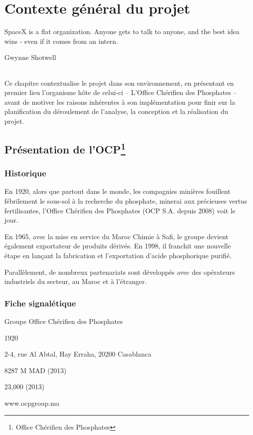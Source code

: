 \chapter{Contexte général du projet}
\epigraph{SpaceX is a flat organization. Anyone gets to talk to anyone, and the best idea wins - even if it comes from an intern.}{Gwynne Shotwell}	
\subparagraph{}
Ce chapitre contextualise le projet dans son environnement, en présentant en premier lieu l'organisme hôte de celui-ci – L'Office Chérifien des Phosphates – avant de motiver les raisons inhérentes à son implémentation pour finir sur la planification du déroulement de l'analyse, la conception et la réalisation du projet.
\cleardoublepage

\section{Présentation de l’OCP\protect\footnote{Office Chérifien des Phosphates}}
	\subsection{Historique}
	En 1920, alors que partout dans le monde, les compagnies minières fouillent fébrilement le
sous-sol à la recherche du phosphate, minerai aux précieuses vertus fertilisantes, l’Office
Chérifien des Phosphates (OCP S.A. depuis 2008) voit le jour.

En 1965, avec la mise en service du Maroc Chimie à Safi, le groupe devient également
exportateur de produits dérivés. En 1998, il franchit une nouvelle étape en lançant la fabrication
et l’exportation d’acide phosphorique purifié.

Parallèlement, de nombreux partenariats sont développés avec des opérateurs industriels du
secteur, au Maroc et à l’étranger.
	\subsection{Fiche signalétique}
	\begin{description}[align=left]
		\item [Nomination sociale :] Groupe Office Chérifien des Phosphates
		\item [Date de création :] 1920
		\item [Siège social :] 2-4, rue Al Abtal, Hay Erraha, 20200 Casablanca
		\item [Capital social :] 8287 M MAD (2013)
		\item [Effectif employé :] 23,000 (2013)
		\item [Site web :] www.ocpgroup.ma
	\end{description}

